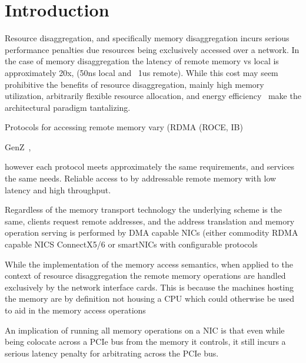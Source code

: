 \section{Introduction}

Resource disaggregation, and specifically memory disaggregation incurs serious
performance penalties due resources being exclusively accessed over a network.
In the case of memory disaggregation the latency of remote memory vs local is
approximately 20x, (50ns local and ~1us remote). While this cost may seem
prohibitive the benefits of resource disaggregation, mainly high memory
utilization, arbitrarily flexible resource allocation, and energy efficiency~\cite{zombieland}
make the architectural paradigm tantalizing.

Protocols for accessing remote memory vary (RDMA (ROCE, IB)

GenZ~\cite{genz}, 

however each protocol meets approximately the same
requirements, and services the same needs. Reliable access to by addressable
remote memory with low latency and high throughput.

Regardless of the memory transport technology the underlying scheme is the
same, clients request remote addresses, and the address translation and memory
operation serving is performed by DMA capable NICs (either commodity RDMA capable
NICS ConnectX5/6 or smartNICs with configurable protocols 


While the implementation of the memory access semantics, when
applied to the context of resource disaggregation the remote memory operations
are handled exclusively by the network interface cards. This is because the
machines hosting the memory are by definition not housing a CPU which could
otherwise be used to aid in the memory access operations

An implication of running all memory
operations on a NIC is that even while being colocate across a PCIe bus from
the memory it controls, it still incurs a serious latency penalty for
arbitrating across the PCIe bus.

